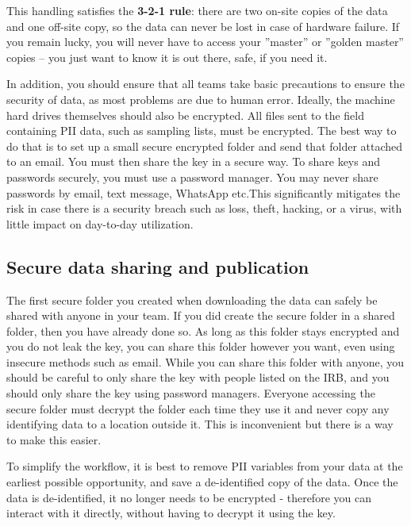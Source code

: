 This handling satisfies the \textbf{3-2-1 rule}: there are 
two on-site copies of the data and one off-site copy, so the data can never 
be lost in case of hardware failure.
If you remain lucky, you will never have to access your ''master'' or 
''golden master'' copies -- you just want to know it is out there, safe, 
if you need it.

In addition, you should ensure that all teams take basic precautions to ensure the 
security of data, as most problems are due to human error. Ideally, the machine 
hard drives themselves should also be encrypted. All files sent to the field containing
PII data, such as sampling lists, must be encrypted. The best way to do that is to 
set up a small secure encrypted folder and send that folder attached to an email.
You must then share the key in a secure way. To share keys and passwords securely, 
you must use a password manager.
You may never share passwords by email, text message, WhatsApp etc.This significantly
mitigates the risk in case there is a security breach such as loss, theft, hacking, 
or a virus, with little impact on day-to-day utilization.

\subsection{Secure data sharing and publication}
The first secure folder you created when downloading the data can safely be shared with
anyone in your team. If you did create the secure folder in a shared folder, then you 
have already done so. As long as this folder stays encrypted and you do not leak the 
key, you can share this folder however you want, even using insecure methods such as 
email. While you can share this folder with anyone, you should be careful to only 
share the key with people listed on the IRB, and you should only share the key using 
password managers. Everyone accessing the secure folder must decrypt the folder each 
time they use it and never copy any identifying data to a location outside it. This is 
inconvenient but there is a way to make this easier.

To simplify the workflow, it is best to remove PII variables from your data at the 
earliest possible opportunity, and save a de-identified copy of the data.
Once the data is de-identified, it no longer needs to be encrypted - therefore 
you can interact with it directly, without having to decrypt it using the key.

